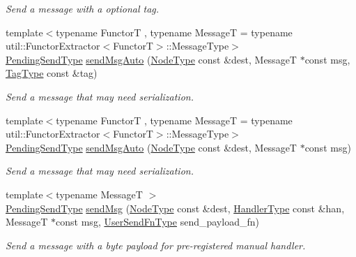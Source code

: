 \begin{DoxyCompactItemize}
\begin{DoxyCompactList}\small\item\em Send a message with a optional tag. \end{DoxyCompactList}\item 
{\footnotesize template$<$typename FunctorT , typename MessageT  = typename util\+::\+Functor\+Extractor$<$\+Functor\+T$>$\+::\+Message\+Type$>$ }\\\hyperlink{structvt_1_1messaging_1_1_active_messenger_a3626a6ca76d8ad4ec7c3b47a2c70d3a8}{Pending\+Send\+Type} \hyperlink{group__functorsend_ga0b627679790c568af6e18132d7ace06b}{send\+Msg\+Auto} (\hyperlink{namespacevt_a866da9d0efc19c0a1ce79e9e492f47e2}{Node\+Type} const \&dest, MessageT $\ast$const msg, \hyperlink{namespacevt_a84ab281dae04a52a4b243d6bf62d0e52}{Tag\+Type} const \&tag)
\begin{DoxyCompactList}\small\item\em Send a message that may need serialization. \end{DoxyCompactList}\item 
{\footnotesize template$<$typename FunctorT , typename MessageT  = typename util\+::\+Functor\+Extractor$<$\+Functor\+T$>$\+::\+Message\+Type$>$ }\\\hyperlink{structvt_1_1messaging_1_1_active_messenger_a3626a6ca76d8ad4ec7c3b47a2c70d3a8}{Pending\+Send\+Type} \hyperlink{group__functorsend_ga12dd37753bdb2a09b5e3e2a40aa31868}{send\+Msg\+Auto} (\hyperlink{namespacevt_a866da9d0efc19c0a1ce79e9e492f47e2}{Node\+Type} const \&dest, MessageT $\ast$const msg)
\begin{DoxyCompactList}\small\item\em Send a message that may need serialization. \end{DoxyCompactList}\item 
{\footnotesize template$<$typename MessageT $>$ }\\\hyperlink{structvt_1_1messaging_1_1_active_messenger_a3626a6ca76d8ad4ec7c3b47a2c70d3a8}{Pending\+Send\+Type} \hyperlink{group__sendpayload_ga0b1f1f3e364e7b1358a36a386b2e6537}{send\+Msg} (\hyperlink{namespacevt_a866da9d0efc19c0a1ce79e9e492f47e2}{Node\+Type} const \&dest, \hyperlink{namespacevt_af64846b57dfcaf104da3ef6967917573}{Handler\+Type} const \&han, MessageT $\ast$const msg, \hyperlink{structvt_1_1messaging_1_1_active_messenger_a4b1993ad77436b6ed6c7fd32801c50ed}{User\+Send\+Fn\+Type} send\+\_\+payload\+\_\+fn)
\begin{DoxyCompactList}\small\item\em Send a message with a byte payload for pre-\/registered manual handler. \end{DoxyCompactList}\item 

\end{DoxyCompactItemize}
